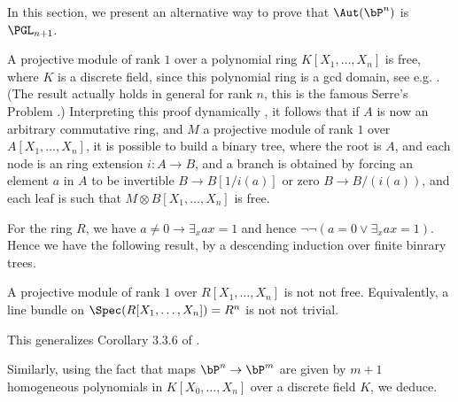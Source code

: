 In this section, we present an alternative way to prove that   $\Aut(\bP^n)$ is $\PGL_{n+1}$.

A projective module of rank $1$ over a polynomial
ring $K[X_1,\dots,X_n]$ is free, where $K$ is a discrete field, since this polynomial ring is a gcd domain, see
e.g. \cite{seminormal}. (The result actually holds in general
for rank $n$, this is the famous Serre's Problem \cite{Lam}.) Interpreting this proof dynamically
\cite{lombardi-quitte}, it follows that if $A$ is now an arbitrary commutative ring, and $M$ a
projective module of rank $1$ over $A[X_1,\dots,X_n]$, it is possible to build a binary tree, where
the root is $A$, and each node is an ring extension $i:A\rightarrow B$, and a branch is obtained
by forcing an element $a$ in $A$ to be invertible $B\rightarrow B[1/i(a)]$ or zero $B\rightarrow B/(i(a))$,
and each leaf is such that $M\otimes B[X_1,\dots,X_n]$ is free.

For the ring $R$, we have $a\neq 0\rightarrow \exists_x ax=1$ and hence $\neg \neg (a=0\vee \exists_x a x=1)$.
Hence we have the following result, by a descending induction over finite binrary trees.

\begin{lemma}\label{notnot}
  A projective module of rank $1$ over $R[X_1,\dots,X_n]$ is not not free. Equivalently, 
a line bundle on $\Spec(R[X_1,\dots,X_n]) = R^n$ is not not trivial.
\end{lemma}

This generalizes Corollary 3.3.6 of \cite{draft}.



Similarly, using the fact that maps $\bP^n\rightarrow \bP^m$ are given by $m+1$ homogeneous polynomials in $K[X_0,\dots,X_n]$
over a discrete field $K$, we deduce.

